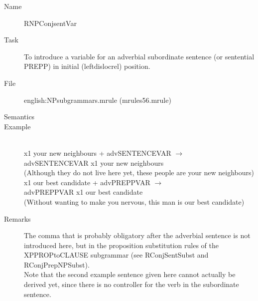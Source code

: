 \begin{description}
\begin{description}
\vspace{1 cm}
\begin{description}
\item[Name] RNPConjsentVar
\item[Task] To introduce a variable for an adverbial subordinate sentence (or 
sentential PREPP) in initial (leftdislocrel) position.
\item[File] english:NPsubgrammars.mrule (mrules56.mrule)
\item[Semantics]
\item[Example] \mbox{}\\
x1 your new neighbours + advSENTENCEVAR $\rightarrow$ \\
advSENTENCEVAR x1 your new neighbours\\
(Although they do not live here yet, these people are your new neighbours)\\
x1 our best candidate + advPREPPVAR $\rightarrow$ \\
advPREPPVAR x1 our best candidate\\
(Without wanting to make you nervous, this man is our best candidate)
\item[Remarks] The comma that is probably obligatory after the adverbial 
sentence is not introduced here, but in the proposition substitution rules of 
the XPPROPtoCLAUSE subgrammar (see RConjSentSubst and RConjPrepNPSubst). \\
Note that the 
second example sentence given here cannot actually be derived yet, since there 
is no controller for the verb in the subordinate sentence.
\end{description}


\end{description}
\end{description}
